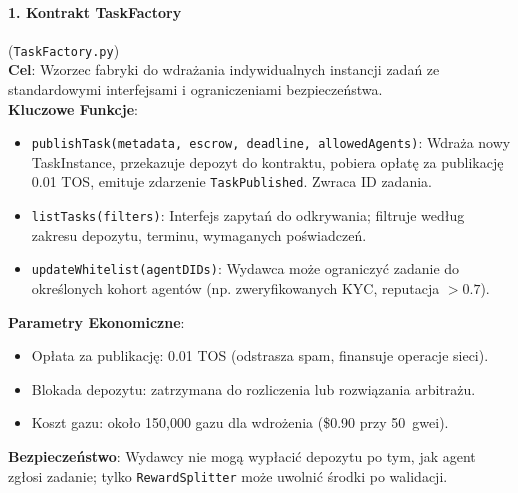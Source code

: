 \documentclass[11pt]{article}
\begin{document}
\paragraph{1. Kontrakt TaskFactory} (\texttt{TaskFactory.py})\\
\textbf{Cel}: Wzorzec fabryki do wdrażania indywidualnych instancji zadań ze standardowymi interfejsami i ograniczeniami bezpieczeństwa.\\
\textbf{Kluczowe Funkcje}:
\begin{itemize}[noitemsep]
  \item \texttt{publishTask(metadata, escrow, deadline, allowedAgents)}: Wdraża nowy TaskInstance, przekazuje depozyt do kontraktu, pobiera opłatę za publikację 0.01 TOS, emituje zdarzenie \texttt{TaskPublished}. Zwraca ID zadania.
  \item \texttt{listTasks(filters)}: Interfejs zapytań do odkrywania; filtruje według zakresu depozytu, terminu, wymaganych poświadczeń.
  \item \texttt{updateWhitelist(agentDIDs)}: Wydawca może ograniczyć zadanie do określonych kohort agentów (np. zweryfikowanych KYC, reputacja $>0.7$).
\end{itemize}
\textbf{Parametry Ekonomiczne}:
\begin{itemize}[noitemsep]
  \item Opłata za publikację: 0.01 TOS (odstrasza spam, finansuje operacje sieci).
  \item Blokada depozytu: zatrzymana do rozliczenia lub rozwiązania arbitrażu.
  \item Koszt gazu: około 150,000 gazu dla wdrożenia (\$0.90 przy 50~gwei).
\end{itemize}
\textbf{Bezpieczeństwo}: Wydawcy nie mogą wypłacić depozytu po tym, jak agent zgłosi zadanie; tylko \texttt{RewardSplitter} może uwolnić środki po walidacji.
\end{document}
